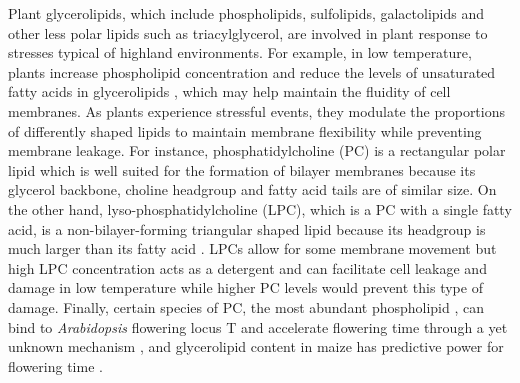 \documentclass[9pt,twocolumn,twoside,lineno]{BioRxiv}
\begin{document}
Plant glycerolipids, which include phospholipids, sulfolipids, galactolipids and other less polar lipids such as triacylglycerol, are involved in plant response to stresses typical of highland environments.
For example, in low temperature, plants increase phospholipid concentration \cite{Degenkolbe2012-wf} and reduce the levels of unsaturated fatty acids in glycerolipids \cite{Welti2002-uk, Lynch1987-ln}, which may help maintain the fluidity of cell membranes.
As plants experience stressful events, they modulate the proportions of differently shaped lipids to maintain membrane flexibility while preventing membrane leakage. 
For instance, phosphatidylcholine (PC) is a rectangular polar lipid which is well suited for the formation of bilayer membranes because its glycerol backbone, choline headgroup and fatty acid tails are of similar size.
On the other hand, lyso-phosphatidylcholine (LPC), which is a PC with a single fatty acid, is a non-bilayer-forming triangular shaped lipid because its headgroup is much larger than its fatty acid \cite{Jouhet2013-fv}.
LPCs allow for some membrane movement but high LPC concentration acts as a detergent \cite{Henriksen2010-cm} and can facilitate cell leakage and damage in low temperature while higher PC levels would prevent this type of damage.
Finally, certain species of PC, the most abundant phospholipid \cite{Gu2017-nd}, can bind to \textit{Arabidopsis} flowering locus T and accelerate flowering time through a yet unknown mechanism \cite{Nakamura2014-qf}, and glycerolipid content in maize has predictive power for flowering time \cite{Riedelsheimer2013-bd}. 
\end{document}
